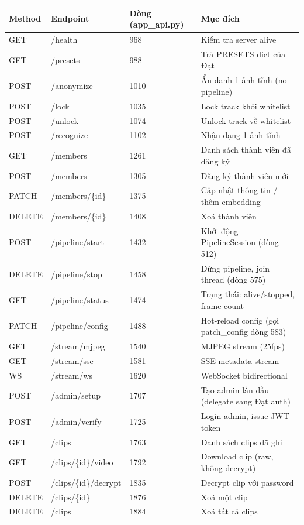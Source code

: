 \documentclass[12pt, a4paper]{article}
\begin{document}
\begin{tcolorbox}[colback=MidnightBlue!4, colframe=MidnightBlue!60, breakable,
  title={\faTable\ \textbf{Tổng hợp endpoints chính (trích dẫn dòng)}}]
\renewcommand{\arraystretch}{1.4}
\begin{tabularx}{\textwidth}{lllX}
\toprule
Method & Endpoint & Dòng (app\_api.py) & Mục đích \\
\midrule
GET  & /health          & 968  & Kiểm tra server alive \\
GET  & /presets         & 988  & Trả PRESETS dict của Đạt \\
POST & /anonymize       & 1010 & Ẩn danh 1 ảnh tĩnh (no pipeline) \\
POST & /lock            & 1035 & Lock track khỏi whitelist \\
POST & /unlock          & 1074 & Unlock track về whitelist \\
POST & /recognize       & 1102 & Nhận dạng 1 ảnh tĩnh \\
\midrule
GET  & /members         & 1261 & Danh sách thành viên đã đăng ký \\
POST & /members         & 1305 & Đăng ký thành viên mới \\
PATCH & /members/\{id\} & 1375 & Cập nhật thông tin / thêm embedding \\
DELETE & /members/\{id\} & 1408 & Xoá thành viên \\
\midrule
POST & /pipeline/start  & 1432 & Khởi động PipelineSession (dòng 512) \\
DELETE & /pipeline/stop & 1458 & Dừng pipeline, join thread (dòng 575) \\
GET  & /pipeline/status & 1474 & Trạng thái: alive/stopped, frame count \\
PATCH & /pipeline/config & 1488 & Hot-reload config (gọi patch\_config dòng 583) \\
\midrule
GET  & /stream/mjpeg    & 1540 & MJPEG stream (25fps) \\
GET  & /stream/sse      & 1581 & SSE metadata stream \\
WS   & /stream/ws       & 1620 & WebSocket bidirectional \\
\midrule
POST & /admin/setup     & 1707 & Tạo admin lần đầu (delegate sang Đạt auth) \\
POST & /admin/verify    & 1725 & Login admin, issue JWT token \\
\midrule
GET  & /clips           & 1763 & Danh sách clips đã ghi \\
GET  & /clips/\{id\}/video & 1792 & Download clip (raw, không decrypt) \\
POST & /clips/\{id\}/decrypt & 1835 & Decrypt clip với password \\
DELETE & /clips/\{id\} & 1876 & Xoá một clip \\
DELETE & /clips          & 1884 & Xoá tất cả clips \\
\bottomrule
\end{tabularx}
\end{tcolorbox}
\end{document}
